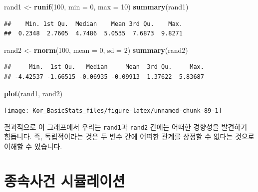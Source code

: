 \documentclass[]{book}
\newenvironment{Shaded}{\begin{snugshade}}{\end{snugshade}}
\newcommand{\DataTypeTok}[1]{\textcolor[rgb]{0.13,0.29,0.53}{#1}}
\newcommand{\DecValTok}[1]{\textcolor[rgb]{0.00,0.00,0.81}{#1}}
\newcommand{\KeywordTok}[1]{\textcolor[rgb]{0.13,0.29,0.53}{\textbf{#1}}}
\newcommand{\NormalTok}[1]{#1}
\newcommand{\StringTok}[1]{\textcolor[rgb]{0.31,0.60,0.02}{#1}}
\begin{document}
\begin{Shaded}
\begin{Highlighting}[]
\NormalTok{rand1 <-}\StringTok{ }\KeywordTok{runif}\NormalTok{(}\DecValTok{100}\NormalTok{, }\DataTypeTok{min =} \DecValTok{0}\NormalTok{, }\DataTypeTok{max =} \DecValTok{10}\NormalTok{)}
\KeywordTok{summary}\NormalTok{(rand1)}
\end{Highlighting}
\end{Shaded}

\begin{verbatim}
##    Min. 1st Qu.  Median    Mean 3rd Qu.    Max. 
##  0.2348  2.7605  4.7486  5.0535  7.6873  9.8271
\end{verbatim}

\begin{Shaded}
\begin{Highlighting}[]
\NormalTok{rand2 <-}\StringTok{ }\KeywordTok{rnorm}\NormalTok{(}\DecValTok{100}\NormalTok{, }\DataTypeTok{mean =} \DecValTok{0}\NormalTok{, }\DataTypeTok{sd =} \DecValTok{2}\NormalTok{)}
\KeywordTok{summary}\NormalTok{(rand2)}
\end{Highlighting}
\end{Shaded}

\begin{verbatim}
##     Min.  1st Qu.   Median     Mean  3rd Qu.     Max. 
## -4.42537 -1.66515 -0.06935 -0.09913  1.37622  5.83687
\end{verbatim}

\begin{Shaded}
\begin{Highlighting}[]
\KeywordTok{plot}\NormalTok{(rand1, rand2)}
\end{Highlighting}
\end{Shaded}

\begin{center}\texttt{[image: Kor\_BasicStats\_files/figure-latex/unnamed-chunk-89-1]} \end{center}

결과적으로 이 그래프에서 우리는 \texttt{rand1}과 \texttt{rand2} 간에는 어떠한 경향성을 발견하기 힘듭니다. 즉, 독립적이라는 것은 두 변수 간에 어떠한 관계를 상정할 수 없다는 것으로 이해할 수 있습니다.

\hypertarget{uxc885uxc18duxc0acuxac74-uxc2dcuxbbacuxb808uxc774uxc158}{%
\section{종속사건 시뮬레이션}\label{uxc885uxc18duxc0acuxac74-uxc2dcuxbbacuxb808uxc774uxc158}}
\end{document}
